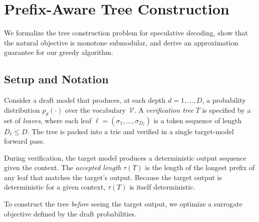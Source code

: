
\newtheorem{definition}{Definition}
\newtheorem{proposition}{Proposition}
\newtheorem{corollary}{Corollary}
\newtheorem{remark}{Remark}

\section{Prefix-Aware Tree Construction}
\label{sec:prefix-aware-tree}

We formalize the tree construction problem for speculative decoding,
show that the natural objective is monotone submodular, and derive an
approximation guarantee for our greedy algorithm.

\subsection{Setup and Notation}
\label{sec:setup}

Consider a draft model that produces, at each depth $d = 1, \dots, D$,
a probability distribution $p_d(\cdot)$ over the vocabulary~$\mathcal{V}$.
A \emph{verification tree} $T$ is specified by a set of \emph{leaves},
where each leaf $\ell = (\sigma_1, \dots, \sigma_{D_\ell})$ is a token
sequence of length $D_\ell \leq D$.  The tree is packed into a trie and
verified in a single target-model forward pass.

During verification, the target model produces a deterministic output
sequence given the context.  The \emph{accepted length} $\tau(T)$ is
the length of the longest prefix of any leaf that matches the target's
output.  Because the target output is deterministic for a given context,
$\tau(T)$ is itself deterministic.

To construct the tree \emph{before} seeing the target output, we
optimize a surrogate objective defined by the draft probabilities.

